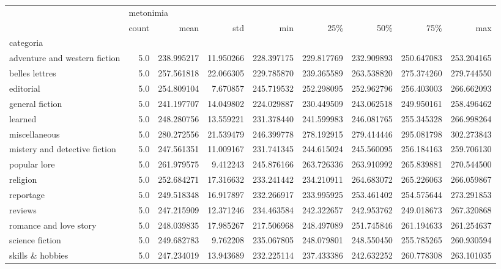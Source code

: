 \documentclass[11pt]{article}
\begin{document}
\begin{tabular}{lrrrrrrrr}
\toprule
{} & \multicolumn{8}{l}{metonimia} \\
{} &     count &        mean &        std &         min &         25\% &         50\% &         75\% &         max \\
categoria                     &           &             &            &             &             &             &             &             \\
\midrule
adventure and western fiction &       5.0 &  238.995217 &  11.950266 &  228.397175 &  229.817769 &  232.909893 &  250.647083 &  253.204165 \\
belles lettres                &       5.0 &  257.561818 &  22.066305 &  229.785870 &  239.365589 &  263.538820 &  275.374260 &  279.744550 \\
editorial                     &       5.0 &  254.809104 &   7.670857 &  245.719532 &  252.298095 &  252.962796 &  256.403003 &  266.662093 \\
general fiction               &       5.0 &  241.197707 &  14.049802 &  224.029887 &  230.449509 &  243.062518 &  249.950161 &  258.496462 \\
learned                       &       5.0 &  248.280756 &  13.559221 &  231.378440 &  241.599983 &  246.081765 &  255.345328 &  266.998264 \\
miscellaneous                 &       5.0 &  280.272556 &  21.539479 &  246.399778 &  278.192915 &  279.414446 &  295.081798 &  302.273843 \\
mistery and detective fiction &       5.0 &  247.561351 &  11.009167 &  231.741345 &  244.615024 &  245.560095 &  256.184163 &  259.706130 \\
popular lore                  &       5.0 &  261.979575 &   9.412243 &  245.876166 &  263.726336 &  263.910992 &  265.839881 &  270.544500 \\
religion                      &       5.0 &  252.684271 &  17.316632 &  233.241442 &  234.210911 &  264.683072 &  265.226063 &  266.059867 \\
reportage                     &       5.0 &  249.518348 &  16.917897 &  232.266917 &  233.995925 &  253.461402 &  254.575644 &  273.291853 \\
reviews                       &       5.0 &  247.215909 &  12.371246 &  234.463584 &  242.322657 &  242.953762 &  249.018673 &  267.320868 \\
romance and love story        &       5.0 &  248.039835 &  17.985267 &  217.506968 &  248.497089 &  251.745846 &  261.194633 &  261.254637 \\
science fiction               &       5.0 &  249.682783 &   9.762208 &  235.067805 &  248.079801 &  248.550450 &  255.785265 &  260.930594 \\
skills \& hobbies              &       5.0 &  247.234019 &  13.943689 &  232.225114 &  237.433386 &  242.632252 &  260.778308 &  263.101035 \\
\bottomrule
\end{tabular}
\end{document}
